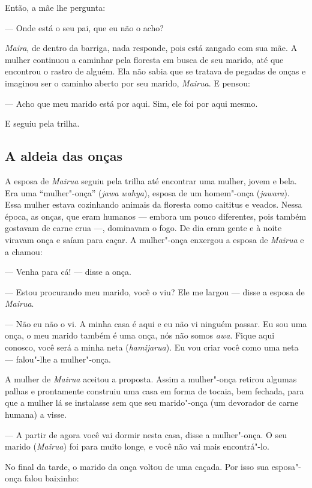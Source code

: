 Então, a mãe lhe pergunta:

--- Onde está o seu pai, que eu não o acho?

\emph{Maira}, de dentro da barriga, nada responde, pois está zangado com
sua mãe. A mulher continuou a caminhar pela floresta em busca de seu
marido, até que encontrou o rastro de alguém. Ela não sabia que se
tratava de pegadas de onças e imaginou ser o caminho aberto por seu
marido, \emph{Mairua}. E pensou:

--- Acho que meu marido está por aqui. Sim, ele foi por aqui mesmo.

E seguiu pela trilha.

\subsection{A aldeia das onças}

\forceindent A esposa de \emph{Mairua} seguiu pela trilha até encontrar uma mulher,
jovem e bela. Era uma ``mulher"-onça'' (\emph{jawa wahya}), esposa de um
homem"-onça (\emph{jawara}). Essa mulher estava cozinhando animais da
floresta como caititus e veados. Nessa época, as onças, que eram humanos
--- embora um pouco diferentes, pois também gostavam de carne crua ---,
dominavam o fogo. De dia eram gente e à noite viravam onça e saíam para
caçar. A mulher"-onça enxergou a esposa de \emph{Mairua} e a chamou:

--- Venha para cá! --- disse a onça.

--- Estou procurando meu marido, você o viu? Ele me largou --- disse a
esposa de \emph{Mairua}.

--- Não eu não o vi. A minha casa é aqui e eu não vi ninguém passar. Eu
sou uma onça, o meu marido também é uma onça, nós não somos \emph{awa}.
Fique aqui conosco, você será a minha neta (\emph{hamijarua}). Eu vou
criar você como uma neta --- falou"-lhe a mulher"-onça.

A mulher de \emph{Mairua} aceitou a proposta. Assim a mulher"-onça
retirou algumas palhas e prontamente construiu uma casa em forma de
tocaia, bem fechada, para que a mulher lá se instalasse sem que seu
marido"-onça (um devorador de carne humana) a visse.

--- A partir de agora você vai dormir nesta casa, disse a mulher"-onça. O
seu marido (\emph{Mairua}) foi para muito longe, e você não vai mais
encontrá"-lo.

No final da tarde, o marido da onça voltou de uma caçada. Por isso sua
esposa"-onça falou baixinho:

